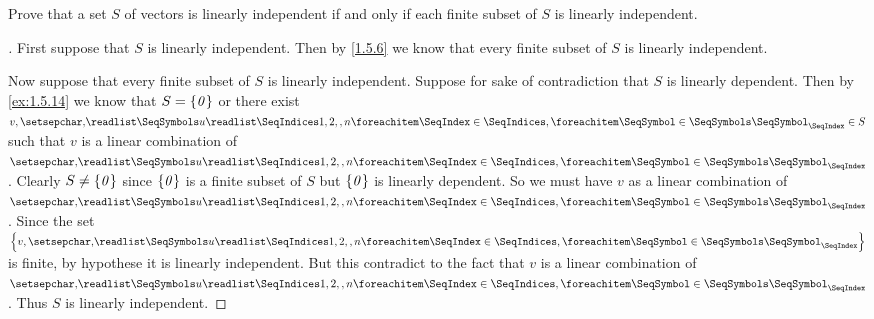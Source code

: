 \begin{ex}\label{ex:1.5.16}
  Prove that a set \(S\) of vectors is linearly independent if and only if each finite subset of \(S\) is linearly independent.
\end{ex}

\begin{proof}[]
  First suppose that \(S\) is linearly independent.
  Then by \cref{1.5.6} we know that every finite subset of \(S\) is linearly independent.

  Now suppose that every finite subset of \(S\) is linearly independent.
  Suppose for sake of contradiction that \(S\) is linearly dependent.
  Then by \cref{ex:1.5.14} we know that \(S = \left\lbrace\mathit{0}\right\rbrace\) or there exist \(v, \seq{u}{1,2,,n} \in S\) such that \(v\) is a linear combination of \(\seq{u}{1,2,,n}\).
  Clearly \(S \neq \left\lbrace\mathit{0}\right\rbrace\) since \(\left\lbrace\mathit{0}\right\rbrace\) is a finite subset of \(S\) but \(\left\lbrace\mathit{0}\right\rbrace\) is linearly dependent.
  So we must have \(v\) as a linear combination of \(\seq{u}{1,2,,n}\).
  Since the set \(\set{v,\seq{u}{1,2,,n}}\) is finite, by hypothese it is linearly independent.
  But this contradict to the fact that \(v\) is a linear combination of \(\seq{u}{1,2,,n}\).
  Thus \(S\) is linearly independent.
\end{proof}
